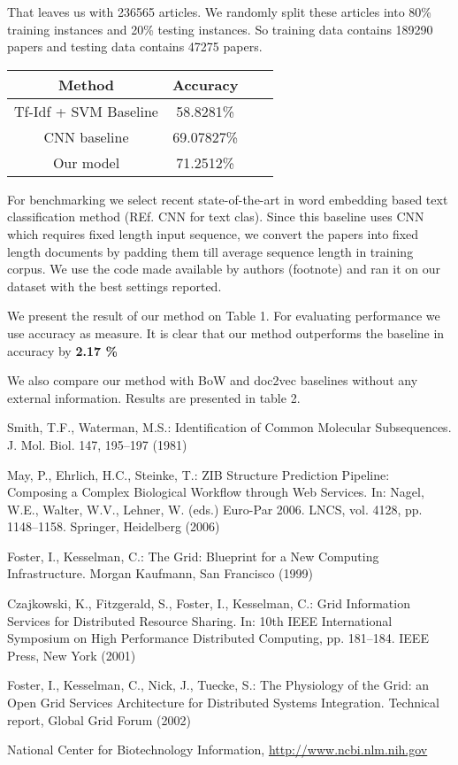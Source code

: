 \documentclass[runningheads,a4paper]{llncs}
\begin{document}
That leaves us with 236565 articles. We randomly split these articles into 80\% training instances and 20\% testing instances. So training data contains 189290 papers and testing data contains 47275 papers.

\begin{center}
\begin{tabular}{ |c|c|c|c| } 
\hline
Method & Accuracy \\
\hline
Tf-Idf + SVM Baseline & 58.8281\% \\ 
\hline
CNN baseline & 69.07827\% \\ 
\hline
Our model & 71.2512\% \\
\hline
\end{tabular}
\end{center}

For benchmarking we select recent state-of-the-art in word embedding based text classification method (REf. CNN for text clas). Since this baseline uses CNN which requires fixed length input sequence, we convert the papers into fixed length documents by padding them till average sequence length in training corpus. We use the code made available by authors (footnote) and ran it on our dataset with the best settings reported. 

We present the result of our method on Table 1. For evaluating performance we use accuracy as measure. It is clear that our method outperforms the baseline in accuracy by {\bf 2.17 \%}

We also compare our method with BoW and doc2vec baselines without any external information. Results are presented in table 2.



\begin{thebibliography}{4}

 Smith, T.F., Waterman, M.S.: Identification of Common Molecular
Subsequences. J. Mol. Biol. 147, 195--197 (1981)

 May, P., Ehrlich, H.C., Steinke, T.: ZIB Structure Prediction Pipeline:
Composing a Complex Biological Workflow through Web Services. In: Nagel,
W.E., Walter, W.V., Lehner, W. (eds.) Euro-Par 2006. LNCS, vol. 4128,
pp. 1148--1158. Springer, Heidelberg (2006)

 Foster, I., Kesselman, C.: The Grid: Blueprint for a New Computing
Infrastructure. Morgan Kaufmann, San Francisco (1999)

 Czajkowski, K., Fitzgerald, S., Foster, I., Kesselman, C.: Grid
Information Services for Distributed Resource Sharing. In: 10th IEEE
International Symposium on High Performance Distributed Computing, pp.
181--184. IEEE Press, New York (2001)

 Foster, I., Kesselman, C., Nick, J., Tuecke, S.: The Physiology of the
Grid: an Open Grid Services Architecture for Distributed Systems
Integration. Technical report, Global Grid Forum (2002)

 National Center for Biotechnology Information, \url{http://www.ncbi.nlm.nih.gov}

\end{thebibliography}
\end{document}
